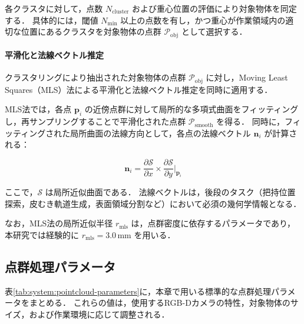各クラスタに対して，点数 $N_{\mathrm{cluster}}$ および重心位置の評価により対象物体を同定する．
具体的には，閾値 $N_{\min}$ 以上の点数を有し，かつ重心が作業領域内の適切な位置にあるクラスタを対象物体の点群 $\mathcal{P}_{\mathrm{obj}}$ として選択する．

\paragraph{平滑化と法線ベクトル推定}

クラスタリングにより抽出された対象物体の点群 $\mathcal{P}_{\mathrm{obj}}$ に対し，Moving Least Squares（MLS）法\cite{PCL-MLS}による平滑化と法線ベクトル推定を同時に適用する．

MLS法では，各点 $\bm{p}_i$ の近傍点群に対して局所的な多項式曲面をフィッティングし，再サンプリングすることで平滑化された点群 $\mathcal{P}_{\mathrm{smooth}}$ を得る．
同時に，フィッティングされた局所曲面の法線方向として，各点の法線ベクトル $\bm{n}_i$ が計算される：

\begin{equation}
  \bm{n}_i = \frac{\partial \mathcal{S}}{\partial x} \times \frac{\partial \mathcal{S}}{\partial y} \Big|_{\bm{p}_i}
\end{equation}

ここで，$\mathcal{S}$ は局所近似曲面である．
法線ベクトルは，後段のタスク（把持位置探索，皮むき軌道生成，表面領域分割など）において必須の幾何学情報となる．

なお，MLS法の局所近似半径 $r_{\mathrm{mls}}$ は，点群密度に依存するパラメータであり，本研究では経験的に $r_{\mathrm{mls}} = 3.0$\,mm を用いる．

\subsection{点群処理パラメータ}
\label{sec:system:pointcloud:processing:parameters}
表\ref{tab:system:pointcloud-parameters}に，本章で用いる標準的な点群処理パラメータをまとめる．
これらの値は，使用するRGB-Dカメラの特性，対象物体のサイズ，および作業環境に応じて調整される．

